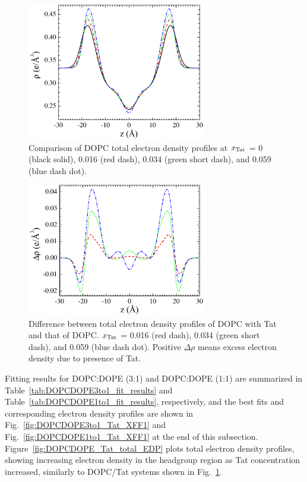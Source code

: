 \begin{figure}[htbp]
  \centering
  \includegraphics[width=0.7\textwidth]{figures/Tat/SDP_Results/EDP/DOPC_Tat_total_EDP}
  \caption[]{
  Comparison of DOPC total electron density profiles at $x_\textrm{Tat}$ = 0 (black solid),
  0.016 (red dash), 0.034 (green short dash), and 0.059 (blue dash dot).}
  \label{fig:DOPC_Tat_total_EDP}
\end{figure}

\begin{figure}[htbp]
  \centering
  \includegraphics[width=0.7\textwidth]{figures/Tat/SDP_Results/EDP/DOPC_Tat_total_EDP_diff}
  \caption[Difference between total electron density profiles of DOPC with Tat 
  and that of DOPC]{Difference between total electron density profiles of DOPC with Tat 
  and that of DOPC. $x_\textrm{Tat}$ = 0.016 (red dash), 0.034 (green short dash), 
  and 0.059 (blue dash dot). Positive $\Delta\rho$ means excess electron density 
  due to presence of Tat.}
  \label{fig:DOPC_Tat_total_EDP_difference}
\end{figure}

Fitting results for DOPC:DOPE (3:1) and DOPC:DOPE (1:1) are summarized 
in Table~\ref{tab:DOPCDOPE3to1_fit_results} and 
Table~\ref{tab:DOPCDOPE1to1_fit_results}, respectively,
and the best fits and corresponding electron density profiles are shown in 
Fig.~\ref{fig:DOPCDOPE3to1_Tat_XFF1} and Fig.~\ref{fig:DOPCDOPE1to1_Tat_XFF1}
at the end of this subsection. 
Figure~\ref{fig:DOPCDOPE_Tat_total_EDP} plots total electron density profiles,
showing increasing electron density in the headgroup region as Tat concentration
increased, similarly to DOPC/Tat systems shown in Fig.~\ref{fig:DOPC_Tat_total_EDP}.

